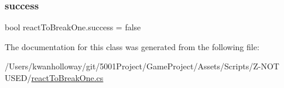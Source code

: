 \subsubsection{\texorpdfstring{success}{success}}
{\footnotesize\ttfamily bool react\+To\+Break\+One.\+success = false}



The documentation for this class was generated from the following file\+:\begin{DoxyCompactItemize}
\item 
/\+Users/kwanholloway/git/5001\+Project/\+Game\+Project/\+Assets/\+Scripts/\+Z-\/\+N\+O\+T U\+S\+E\+D/\hyperlink{react_to_break_one_8cs}{react\+To\+Break\+One.\+cs}\end{DoxyCompactItemize}
